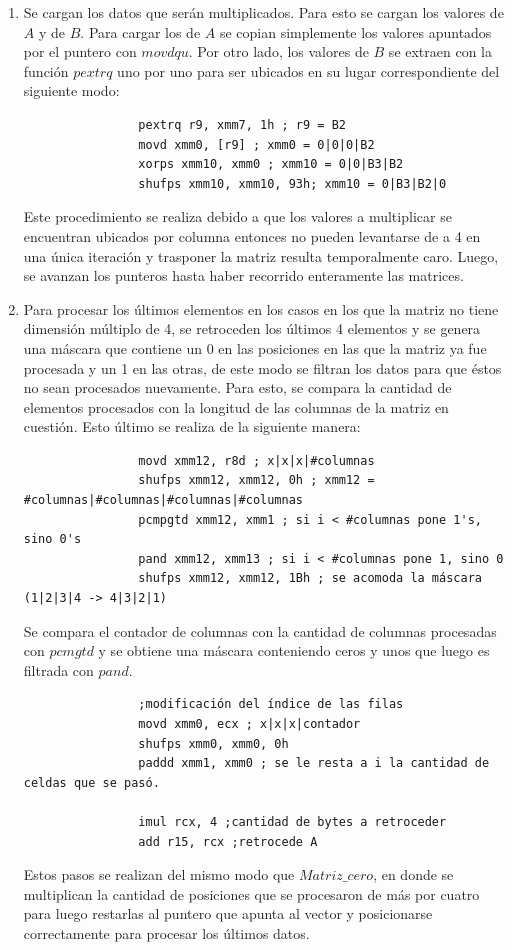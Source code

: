 \documentclass[10pt, a4paper]{article}
\begin{document}
\begin{enumerate}
\item Se cargan los datos que serán multiplicados. Para esto se cargan los valores de $A$ y de $B$. Para cargar los de $A$ se copian simplemente los valores apuntados por el puntero con $movdqu$. Por otro lado, los valores de $B$ se extraen con la función $pextrq$ uno por uno para ser ubicados en su lugar correspondiente del siguiente modo:
\begin{verbatim}
                pextrq r9, xmm7, 1h ; r9 = B2
                movd xmm0, [r9] ; xmm0 = 0|0|0|B2
                xorps xmm10, xmm0 ; xmm10 = 0|0|B3|B2
                shufps xmm10, xmm10, 93h; xmm10 = 0|B3|B2|0
\end{verbatim}
Este procedimiento se realiza debido a que los valores a multiplicar se encuentran ubicados por columna entonces no pueden levantarse de a 4 en una única iteración y trasponer la matriz resulta temporalmente caro. Luego, se avanzan los punteros hasta haber recorrido enteramente las matrices.

\item Para procesar los últimos elementos en los casos en los que la matriz no tiene dimensión múltiplo de 4, se retroceden los últimos 4 elementos y se genera una máscara que contiene un 0 en las posiciones en las que la matriz ya fue procesada y un 1 en las otras, de este modo se filtran los datos para que éstos no sean procesados nuevamente. Para esto, se compara la cantidad de elementos procesados con la longitud de las columnas de la matriz en cuestión. Esto último se realiza de la siguiente manera:
\begin{verbatim}
                movd xmm12, r8d ; x|x|x|#columnas
                shufps xmm12, xmm12, 0h ; xmm12 = #columnas|#columnas|#columnas|#columnas
                pcmpgtd xmm12, xmm1 ; si i < #columnas pone 1's, sino 0's
                pand xmm12, xmm13 ; si i < #columnas pone 1, sino 0
                shufps xmm12, xmm12, 1Bh ; se acomoda la máscara (1|2|3|4 -> 4|3|2|1)
\end{verbatim}
Se compara el contador de columnas con la cantidad de columnas procesadas con $pcmgtd$ y se obtiene una máscara conteniendo ceros y unos que luego es filtrada con $pand$.
\begin{verbatim}
                ;modificación del índice de las filas
                movd xmm0, ecx ; x|x|x|contador
                shufps xmm0, xmm0, 0h
                paddd xmm1, xmm0 ; se le resta a i la cantidad de celdas que se pasó.
               
                imul rcx, 4 ;cantidad de bytes a retroceder            
                add r15, rcx ;retrocede A
\end{verbatim}
Estos pasos se realizan del mismo modo que $Matriz\_cero$, en donde se multiplican la cantidad de posiciones que se procesaron de más por cuatro para luego restarlas al puntero que apunta al vector y posicionarse correctamente para procesar los últimos datos.


\end{enumerate}
\end{document}
